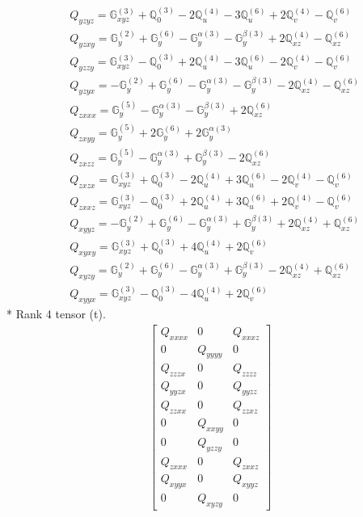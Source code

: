 \documentclass[fleqn,8pt,landscape]{jsarticle}
\begin{document}
\begin{align*}
& Q_{yzyz} = \mathbb{G}_{xyz}^{(3)} + \mathbb{Q}_{0}^{(3)} - 2 \mathbb{Q}_{u}^{(4)} - 3 \mathbb{Q}_{u}^{(6)} + 2 \mathbb{Q}_{v}^{(4)} - \mathbb{Q}_{v}^{(6)} \\
& Q_{yzxy} = \mathbb{G}_{y}^{(2)} + \mathbb{G}_{y}^{(6)} - \mathbb{G}_{y}^{\alpha(3)} - \mathbb{G}_{y}^{\beta(3)} + 2 \mathbb{Q}_{xz}^{(4)} - \mathbb{Q}_{xz}^{(6)} \\
& Q_{yzzy} = \mathbb{G}_{xyz}^{(3)} - \mathbb{Q}_{0}^{(3)} + 2 \mathbb{Q}_{u}^{(4)} - 3 \mathbb{Q}_{u}^{(6)} - 2 \mathbb{Q}_{v}^{(4)} - \mathbb{Q}_{v}^{(6)} \\
& Q_{yzyx} = - \mathbb{G}_{y}^{(2)} + \mathbb{G}_{y}^{(6)} - \mathbb{G}_{y}^{\alpha(3)} - \mathbb{G}_{y}^{\beta(3)} - 2 \mathbb{Q}_{xz}^{(4)} - \mathbb{Q}_{xz}^{(6)} \\
& Q_{zxxx} = \mathbb{G}_{y}^{(5)} - \mathbb{G}_{y}^{\alpha(3)} - \mathbb{G}_{y}^{\beta(3)} + 2 \mathbb{Q}_{xz}^{(6)} \\
& Q_{zxyy} = \mathbb{G}_{y}^{(5)} + 2 \mathbb{G}_{y}^{(6)} + 2 \mathbb{G}_{y}^{\alpha(3)} \\
& Q_{zxzz} = \mathbb{G}_{y}^{(5)} - \mathbb{G}_{y}^{\alpha(3)} + \mathbb{G}_{y}^{\beta(3)} - 2 \mathbb{Q}_{xz}^{(6)} \\
& Q_{zxzx} = \mathbb{G}_{xyz}^{(3)} + \mathbb{Q}_{0}^{(3)} - 2 \mathbb{Q}_{u}^{(4)} + 3 \mathbb{Q}_{u}^{(6)} - 2 \mathbb{Q}_{v}^{(4)} - \mathbb{Q}_{v}^{(6)} \\
& Q_{zxxz} = \mathbb{G}_{xyz}^{(3)} - \mathbb{Q}_{0}^{(3)} + 2 \mathbb{Q}_{u}^{(4)} + 3 \mathbb{Q}_{u}^{(6)} + 2 \mathbb{Q}_{v}^{(4)} - \mathbb{Q}_{v}^{(6)} \\
& Q_{xyyz} = - \mathbb{G}_{y}^{(2)} + \mathbb{G}_{y}^{(6)} - \mathbb{G}_{y}^{\alpha(3)} + \mathbb{G}_{y}^{\beta(3)} + 2 \mathbb{Q}_{xz}^{(4)} + \mathbb{Q}_{xz}^{(6)} \\
& Q_{xyxy} = \mathbb{G}_{xyz}^{(3)} + \mathbb{Q}_{0}^{(3)} + 4 \mathbb{Q}_{u}^{(4)} + 2 \mathbb{Q}_{v}^{(6)} \\
& Q_{xyzy} = \mathbb{G}_{y}^{(2)} + \mathbb{G}_{y}^{(6)} - \mathbb{G}_{y}^{\alpha(3)} + \mathbb{G}_{y}^{\beta(3)} - 2 \mathbb{Q}_{xz}^{(4)} + \mathbb{Q}_{xz}^{(6)} \\
& Q_{xyyx} = \mathbb{G}_{xyz}^{(3)} - \mathbb{Q}_{0}^{(3)} - 4 \mathbb{Q}_{u}^{(4)} + 2 \mathbb{Q}_{v}^{(6)}
\end{align*}
* Rank 4 tensor (t).
\begin{align*}
\begin{bmatrix} Q_{xxxx} & 0 & Q_{xxxz} \\ 0 & Q_{yyyy} & 0 \\ Q_{zzzx} & 0 & Q_{zzzz} \\ Q_{yyzx} & 0 & Q_{yyzz} \\ Q_{zzxx} & 0 & Q_{zzxz} \\ 0 & Q_{xxyy} & 0 \\ 0 & Q_{yzzy} & 0 \\ Q_{zxxx} & 0 & Q_{zxxz} \\ Q_{xyyx} & 0 & Q_{xyyz} \\ 0 & Q_{xyzy} & 0 \end{bmatrix}
\end{align*}
\end{document}
